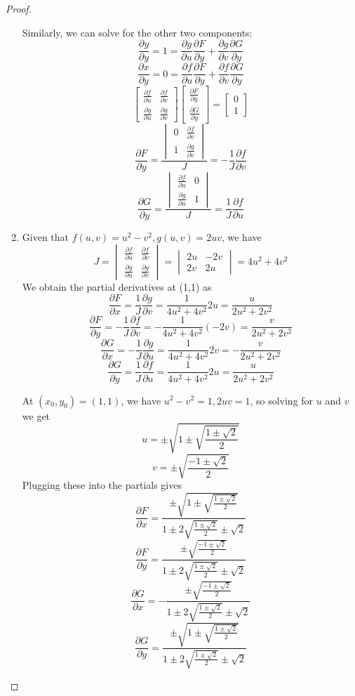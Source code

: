 \documentclass[12pt]{article}
\newcommand{\partialD}[2]{\frac{\partial #1}{\partial #2}}
\begin{document}
\begin{proof}
\begin{enumerate}
    Similarly, we can solve for the other two components:
    \[\partialD{y}{y}=1=\partialD{g}{u}\partialD{F}{y}+\partialD{g}{v}\partialD{G}{y}\]
    \[\partialD{x}{y}=0=\partialD{f}{u}\partialD{F}{y}+\partialD{f}{v}\partialD{G}{y}\]
    \[
        \begin{bmatrix}
            \frac{\partial f}{\partial u} & \frac{\partial f}{\partial v} \\
            \frac{\partial g}{\partial u} & \frac{\partial g}{\partial v} 
        \end{bmatrix}
        \begin{bmatrix}
           \partialD{F}{y} \\ \partialD{G}{y} 
        \end{bmatrix}
        =
        \begin{bmatrix}
           0 \\ 1 
        \end{bmatrix}
    \]
    \[
    \partialD{F}{y}=\frac{\begin{vmatrix}
       0 & \partialD{f}{v} \\ 1 & \partialD{g}{v} 
    \end{vmatrix}}{J}=
    -\frac{1}{J}\partialD{f}{v}
    \]
    \[
    \partialD{G}{y}=\frac{\begin{vmatrix}
       \partialD{f}{u} & 0 \\ \partialD{g}{u} & 1  
    \end{vmatrix}}{J}=
    \frac{1}{J}\partialD{f}{u}
    \]
    \item Given that $f(u,v)=u^2-v^2, g(u,v)=2uv$, we have
    \[
    J=\begin{vmatrix}
      \partialD{f}{u} & \partialD{f}{v} \\ \partialD{g}{u} & \partialD{g}{v}  
    \end{vmatrix}=
    \begin{vmatrix}
      2u & -2v \\ 2v & 2u
    \end{vmatrix} = 4u^2+4v^2
    \] 
   We obtain the partial derivatives at (1,1) as
    \[\partialD{F}{x}=\frac{1}{J}\partialD{g}{v}=\frac{1}{4u^2+4v^2}2u=\frac{u}{2u^2+2v^2}\]
    \[\partialD{F}{y}=-\frac{1}{J}\partialD{f}{v}=-\frac{1}{4u^2+4v^2}(-2v)=\frac{v}{2u^2+2v^2}\]
    \[\partialD{G}{x}=-\frac{1}{J}\partialD{g}{u}=\frac{1}{4u^2+4v^2}2v=-\frac{v}{2u^2+2v^2}\]
    \[\partialD{G}{y}=\frac{1}{J}\partialD{f}{u}=\frac{1}{4u^2+4v^2}2u=\frac{u}{2u^2+2v^2}\]

    At $(x_0,y_0)=(1,1)$, we have $u^2-v^2=1, 2uv=1$, so solving for $u$ and $v$ we get 
    \[u=\pm\sqrt{1\pm\sqrt{\frac{1\pm\sqrt{2}}{2}}}\]
    \[v=\pm\sqrt{\frac{-1\pm\sqrt{2}}2}\]
    Plugging these into the partials gives
    \[\partialD{F}{x}=\frac{\pm\sqrt{1\pm\sqrt{\frac{1\pm\sqrt{2}}{2}}}}{1\pm2\sqrt{\frac{1\pm\sqrt{2}}{2}}\pm\sqrt{2}}\]
    \[\partialD{F}{y}=\frac{\pm\sqrt{\frac{-1\pm\sqrt{2}}2}}{1\pm2\sqrt{\frac{1\pm\sqrt{2}}{2}}\pm\sqrt{2}}\]
    \[\partialD{G}{x}=-\frac{\pm\sqrt{\frac{-1\pm\sqrt{2}}2}}{1\pm2\sqrt{\frac{1\pm\sqrt{2}}{2}}\pm\sqrt{2}}\]
    \[\partialD{G}{y}=\frac{\pm\sqrt{1\pm\sqrt{\frac{1\pm\sqrt{2}}{2}}}}{1\pm2\sqrt{\frac{1\pm\sqrt{2}}{2}}\pm\sqrt{2}}\]


\end{enumerate}
\end{proof}
\end{document}

